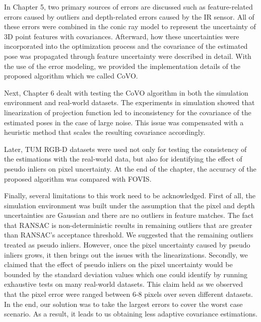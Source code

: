 \documentclass[a4paper]{report}
\numberwithin{figure}{section}
\begin{document}
In Chapter 5, two primary sources of errors are discussed such as
feature-related errors caused by outliers and depth-related errors caused by
the IR sensor.  All of these errors were combined in the conic ray model to
represent the uncertainty of 3D point features with covariances.
Afterward, how these uncertainties were incorporated into the optimization
process and the covariance of the estimated pose was propagated through feature
uncertainty were described in detail. With the use of the error modeling, we
provided the implementation details of the proposed algorithm which we called
CoVO.

Next, Chapter 6 dealt with testing the CoVO algorithm in both the simulation
environment and real-world datasets. 
The experiments in simulation showed that linearization of projection function
led to inconsistency for the covariance of the estimated poses in the case of
large noise.  This issue was compensated with a heuristic method that scales
the resulting covariance accordingly.

Later, TUM RGB-D datasets were used not only for testing the consistency of the
estimations with the real-world data, but also for identifying the effect of
pseudo inliers on pixel uncertainty. 
At the end of the chapter, the accuracy of the proposed algorithm was compared
with FOVIS.

Finally, several limitations to this work need to be acknowledged.  First of
all, the simulation environment was built under the assumption that the pixel
and depth uncertainties are Gaussian and there are no outliers in feature
matches. The fact that RANSAC is non-deterministic results in remaining
outliers that are greater than RANSAC's acceptance threshold. We suggested that
the remaining outliers treated as pseudo inliers.  However, once the pixel
uncertainty caused by pseudo inliers grows, it then brings out the issues with
the linearizations.  Secondly, we claimed that the effect of pseudo inliers on
the pixel uncertainty would be bounded by the standard deviation values which
one could identify by running exhaustive tests on many real-world datasets.
This claim held as we observed that the pixel error were ranged between 6-8 pixels
over seven different datasets. In the end, our solution was to take the largest
errors to cover the worst case scenario.  As a result, it leads to us obtaining less 
adaptive covariance estimations. 
\end{document}
